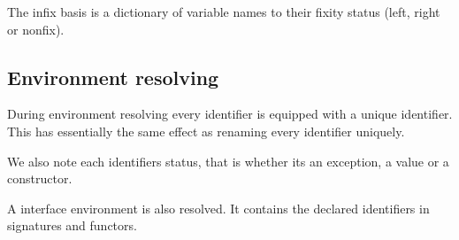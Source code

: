 The infix basis is a dictionary of variable names to their fixity status (left,
right or nonfix).

\subsection{Environment resolving}
During environment resolving every identifier is equipped with a unique
identifier. This has essentially the same effect as renaming every identifier
uniquely.

We also note each identifiers status, that is whether its an exception, a value
or a constructor.

A interface environment is also resolved. It contains the declared identifiers
in signatures and functors.


